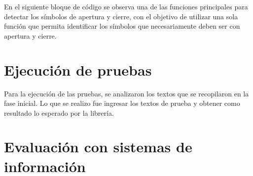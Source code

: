

En el siguiente bloque de código se observa una de las funciones principales para detectar los símbolos de apertura y cierre, con el objetivo de utilizar una sola función que permita identificar los símbolos que necesariamente deben ser con apertura y cierre. 



\section{Ejecución de pruebas}

Para la ejecución de las pruebas, se analizaron los textos que se recopilaron en la fase inicial. Lo que se realizo fue ingresar los textos de prueba y obtener como resultado lo esperado por la librería.

\section{Evaluación con sistemas de información}
